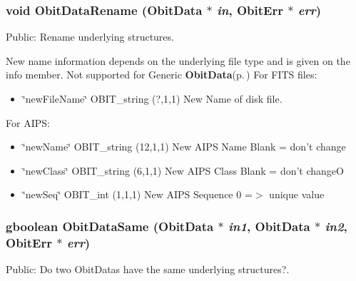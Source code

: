 \subsubsection{\setlength{\rightskip}{0pt plus 5cm}void Obit\-Data\-Rename ({\bf Obit\-Data} $\ast$ {\em in}, {\bf Obit\-Err} $\ast$ {\em err})}\label{ObitData_8c_a13}


Public: Rename underlying structures. 

New name information depends on the underlying file type and is given on the info member. Not supported for Generic {\bf Obit\-Data}{\rm (p.\,\pageref{structObitData})} For FITS files: \begin{itemize}
\item \char`\"{}new\-File\-Name\char`\"{} OBIT\_\-string (?,1,1) New Name of disk file.\end{itemize}
For AIPS: \begin{itemize}
\item \char`\"{}new\-Name\char`\"{} OBIT\_\-string (12,1,1) New AIPS Name Blank = don't change \item \char`\"{}new\-Class\char`\"{} OBIT\_\-string (6,1,1) New AIPS Class Blank = don't change\-O \item \char`\"{}new\-Seq\char`\"{} OBIT\_\-int (1,1,1) New AIPS Sequence 0 =$>$ unique value 
\end{itemize}
\subsubsection{\setlength{\rightskip}{0pt plus 5cm}gboolean Obit\-Data\-Same ({\bf Obit\-Data} $\ast$ {\em in1}, {\bf Obit\-Data} $\ast$ {\em in2}, {\bf Obit\-Err} $\ast$ {\em err})}\label{ObitData_8c_a11}


Public: Do two Obit\-Datas have the same underlying structures?. 

